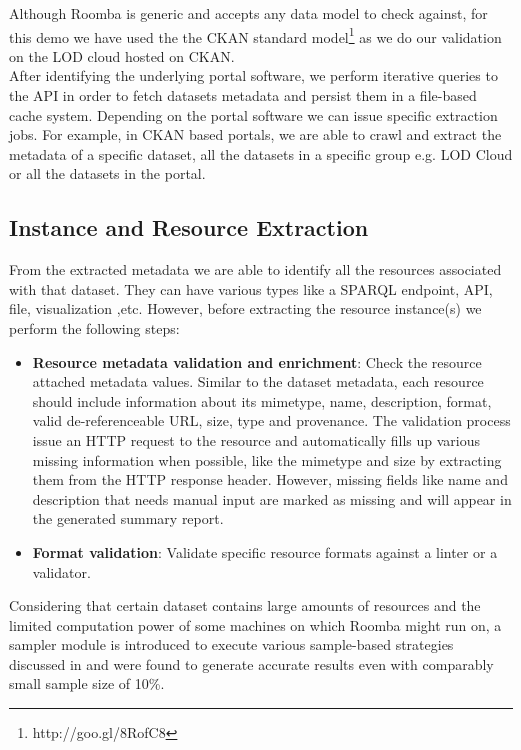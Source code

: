 \documentclass{sig-alternate}
\begin{document}
Although Roomba is generic and accepts any data model to check against, for this demo we have used the the CKAN standard model\footnote{http://goo.gl/8RofC8} as we do our validation on the LOD cloud hosted on CKAN.\\

After identifying the underlying portal software, we perform iterative queries to the API in order to fetch datasets metadata and persist them in a file-based cache system.
Depending on the portal software we can issue specific extraction jobs. For example, in CKAN based portals, we are able to crawl and extract the metadata of a specific dataset, all the datasets in a specific group e.g. LOD Cloud or all the datasets in the portal.

\subsection{Instance and Resource Extraction}

From the extracted metadata we are able to identify all the resources associated with that dataset. They can have various types like a SPARQL endpoint, API, file, visualization ,etc. However, before extracting the resource instance(s) we perform the following steps:

\begin{itemize}
  \item \textbf{Resource metadata validation and enrichment}: Check the resource attached metadata values. Similar to the dataset metadata, each resource should include information about its mimetype, name, description, format, valid de-referenceable URL, size, type and provenance. The validation process issue an HTTP request to the resource and automatically fills up various missing information when possible, like the mimetype and size by extracting them from the HTTP response header. However, missing fields like name and description that needs manual input are marked as missing and will appear in the generated summary report.
  \item \textbf{Format validation}: Validate specific resource formats against a linter or a validator.
\end{itemize}

Considering that certain dataset contains large amounts of resources and the limited computation power of some machines on which Roomba might run on, a sampler module is introduced to execute various sample-based strategies discussed in \cite{scalableApproach} and were found to generate accurate results even with comparably small sample size of 10\%.
\end{document}
